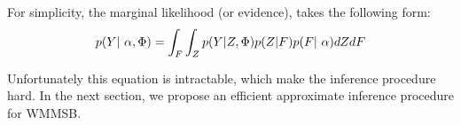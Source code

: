 
For simplicity, the marginal likelihood (or evidence), takes the following form:
\begin{equation}
    \p(Y | \alpha, \Phi) = \int_F \int_Z \p(Y| Z, \Phi) \p(Z|F) \p(F| \alpha) dZ dF
\end{equation}

Unfortunately this equation is intractable, which make the inference procedure hard. In the next section, we propose an efficient approximate inference procedure for WMMSB.
